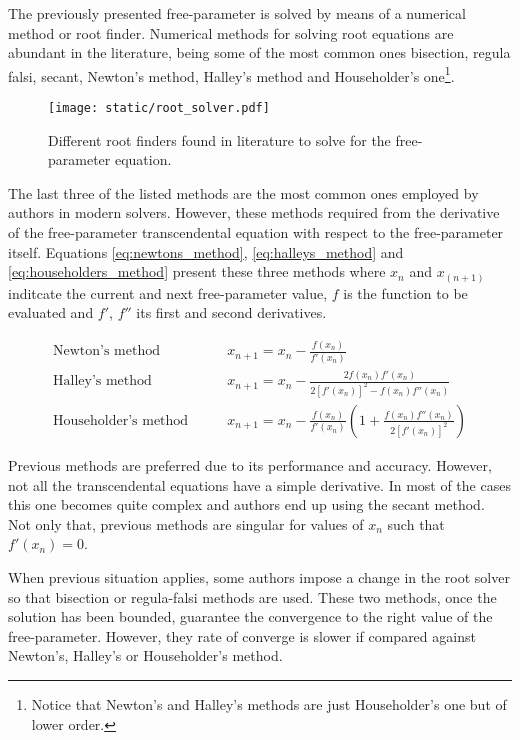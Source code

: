 The previously presented free-parameter is solved by means of a numerical method
or root finder. Numerical methods for solving root equations are abundant in the
literature, being some of the most common ones bisection, regula falsi, secant,
Newton's method, Halley's method and Householder's one\footnote{Notice that
Newton's and Halley's methods are just Householder's one but of lower order.}.

\vspace{0.5cm}
\begin{figure}[h]
  \centering
  \texttt{[image: static/root\_solver.pdf]}
  \caption{Different root finders found in literature to solve for the
  free-parameter equation.}
  \label{fig:numerical_method}
\end{figure}


The last three of the listed methods are the most common ones employed by
authors in modern solvers. However, these methods required from the derivative
of the free-parameter transcendental equation with respect to the free-parameter
itself. Equations \ref{eq:newtons_method}, \ref{eq:halleys_method} and
\ref{eq:householders_method} present these three methods where $x_n$ and
$x_(n+1)$ inditcate the current and next free-parameter value, $f$ is the
function to be evaluated and $f'$, $f''$ its first and second derivatives.

\begin{align}
	\text{Newton's method} \quad\quad &x_{n+1} = x_{n} - \frac{f(x_n)}{f'(x_n)} \label{eq:newtons_method}\\
	\text{Halley's method} \quad\quad &x_{n+1} = x_{n} - \frac{2f(x_n)f'(x_n)}{2\left[f'(x_n)\right]^{2} - f(x_n)f''(x_n)} \label{eq:halleys_method}\\
	\text{Householder's method} \quad\quad &x_{n+1} = x_{n} - \frac{f(x_n)}{f'(x_n)}\left(1 + \frac{f(x_n)f''(x_n)}{2\left[f'(x_n)\right]^{2}}\right) \label{eq:householders_method}
\end{align}


Previous methods are preferred due to its performance and accuracy. However, not
all the transcendental equations have a simple derivative. In most of the cases
this one becomes quite complex and authors end up using the secant method. Not
only that, previous methods are singular for values of $x_n$ such that
$f'(x_n)=0$.

When previous situation applies, some authors impose a change in the root solver
so that bisection or regula-falsi methods are used. These two methods, once the
solution has been bounded, guarantee the convergence to the right value of the
free-parameter. However, they rate of converge is slower if compared against
Newton's, Halley's or Householder's method.

